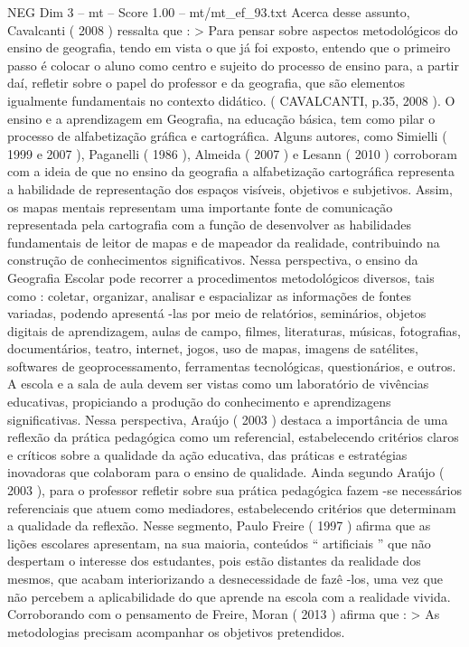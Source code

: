 \begin{textsample}{NEG Dim 3 – mt – Score 1.00 – mt/mt\_ef\_93.txt}
Acerca desse assunto, Cavalcanti ( 2008 ) ressalta que : > Para pensar sobre aspectos metodológicos do ensino de geografia, tendo em vista o que já foi exposto, entendo que o primeiro passo é colocar o aluno como centro e sujeito do processo de ensino para, a partir daí, refletir sobre o papel do professor e da geografia, que são elementos igualmente fundamentais no contexto didático. ( CAVALCANTI, p.35, 2008 ).
O ensino e a aprendizagem em Geografia, na educação básica, tem como pilar o processo de alfabetização gráfica e cartográfica.
Alguns autores, como Simielli ( 1999 e 2007 ), Paganelli ( 1986 ), Almeida ( 2007 ) e Lesann ( 2010 ) corroboram com a ideia de que no ensino da geografia a alfabetização cartográfica representa a habilidade de representação dos espaços visíveis, objetivos e subjetivos.
Assim, os mapas mentais representam uma importante fonte de comunicação representada pela cartografia com a função de desenvolver as habilidades fundamentais de leitor de mapas e de mapeador da realidade, contribuindo na construção de conhecimentos significativos.
Nessa perspectiva, o ensino da Geografia Escolar pode recorrer a procedimentos metodológicos diversos, tais como : coletar, organizar, analisar e espacializar as informações de fontes variadas, podendo apresentá -las por meio de relatórios, seminários, objetos digitais de aprendizagem, aulas de campo, filmes, literaturas, músicas, fotografias, documentários, teatro, internet, jogos, uso de mapas, imagens de satélites, softwares de geoprocessamento, ferramentas tecnológicas, questionários, e outros.
A escola e a sala de aula devem ser vistas como um laboratório de vivências educativas, propiciando a produção do conhecimento e aprendizagens significativas.
Nessa perspectiva, Araújo ( 2003 ) destaca a importância de uma reflexão da prática pedagógica como um referencial, estabelecendo critérios claros e críticos sobre a qualidade da ação educativa, das práticas e estratégias inovadoras que colaboram para o ensino de qualidade.
Ainda segundo Araújo ( 2003 ), para o professor refletir sobre sua prática pedagógica fazem -se necessários referenciais que atuem como mediadores, estabelecendo critérios que determinam a qualidade da reflexão.
Nesse segmento, Paulo Freire ( 1997 ) afirma que as lições escolares apresentam, na sua maioria, conteúdos “ artificiais ” que não despertam o interesse dos estudantes, pois estão distantes da realidade dos mesmos, que acabam interiorizando a desnecessidade de fazê -los, uma vez que não percebem a aplicabilidade do que aprende na escola com a realidade vivida.
Corroborando com o pensamento de Freire, Moran ( 2013 ) afirma que : > As metodologias precisam acompanhar os objetivos pretendidos.

\end{textsample}

